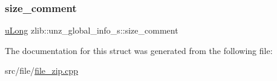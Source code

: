 \subsubsection{\texorpdfstring{size\+\_\+comment}{size\_comment}}
{\footnotesize\ttfamily \hyperlink{namespacezlib_a3bc0123d9337acd75d286df79e6cf7da}{u\+Long} zlib\+::unz\+\_\+global\+\_\+info\+\_\+s\+::size\+\_\+comment}



The documentation for this struct was generated from the following file\+:\begin{DoxyCompactItemize}
\item 
src/file/\hyperlink{file__zip_8cpp}{file\+\_\+zip.\+cpp}\end{DoxyCompactItemize}
